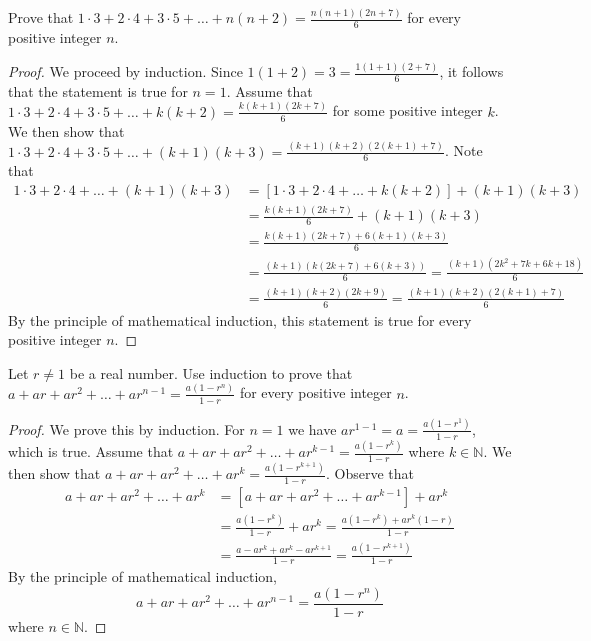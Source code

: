 \documentclass[12pt]{article}
\newcommand{\N}{\mathbb{N}}
\newenvironment{problem}[2][Problem]{\begin{trivlist}
		\item[\hskip \labelsep {\bfseries #1}\hskip \labelsep {\bfseries #2.}]}{\end{trivlist}}
\begin{document}
\begin{problem}{9}
	Prove that $1\cdot 3+2\cdot 4+ 3\cdot 5+\ldots+n(n+2)=\frac{n(n+1)(2n+7)}{6}$ for every positive integer $n$.
	\begin{proof}
		We proceed by induction. Since $1(1+2)=3=\frac{1(1+1)(2+7)}{6}$, it follows that the statement is true for $n=1$. Assume that $1\cdot 3+2\cdot 4+ 3\cdot 5+\ldots+k(k+2)=\frac{k(k+1)(2k+7)}{6}$ for some positive integer $k$. We then show that $1\cdot 3+2\cdot 4+ 3\cdot 5+\ldots+(k+1)(k+3)=\frac{(k+1)(k+2)(2(k+1)+7)}{6}$. Note that
		\begin{align*}
			1\cdot 3+2\cdot 4+\ldots+(k+1)(k+3) &= [1\cdot 3 + 2\cdot 4 +\ldots+k(k+2)] + (k+1)(k+3)\\
			&= \frac{k(k+1)(2k+7)}{6} + (k+1)(k+3) \\
			&= \frac{k(k+1)(2k+7) + 6(k+1)(k+3)}{6}\\
			&= \frac{(k+1)(k(2k+7)+6(k+3))}{6} = \frac{(k+1)(2k^{2}+7k+6k+18)}{6}\\
			&= \frac{(k+1)(k+2)(2k+9)}{6} = \frac{(k+1)(k+2)(2(k+1)+7)}{6}
		\end{align*}
	By the principle of mathematical induction, this statement is true for every positive integer $n$.
	\end{proof}
\end{problem}

\begin{problem}{10}
	Let $r\neq 1$ be a real number. Use induction to prove that $a+ar+ar^{2}+\ldots+ar^{n-1}=\frac{a(1-r^{n})}{1-r}$ for every positive integer $n$.
	\begin{proof}
		We prove this by induction. For $n=1$ we have $ar^{1-1} = a = \frac{a(1-r^{1})}{1-r}$, which is true. Assume that $a+ar+ar^{2}+\ldots+ar^{k-1}=\frac{a(1-r^{k})}{1-r}$ where $k\in \N$. We then show that $a+ar+ar^{2}+\ldots+ar^{k}=\frac{a(1-r^{k+1})}{1-r}$. Observe that
		\begin{align*}
			a+ar+ar^{2}+\ldots+ar^{k} &= [a+ar+ar^{2}+\ldots+ar^{k-1}] + ar^{k}\\
			&= \frac{a(1-r^{k})}{1-r}+ar^{k} = \frac{a(1-r^{k})+ar^{k}(1-r)}{1-r}\\
			&= \frac{a-ar^{k}+ar^{k}-ar^{k+1}}{1-r}=\frac{a(1-r^{k+1})}{1-r}
		\end{align*}
	By the principle of mathematical induction,
	\begin{equation*}
		a+ar+ar^{2}+\ldots+ar^{n-1}=\frac{a(1-r^{n})}{1-r}
	\end{equation*}
	where $n\in \N$.
	\end{proof}
\end{problem}
\end{document}
